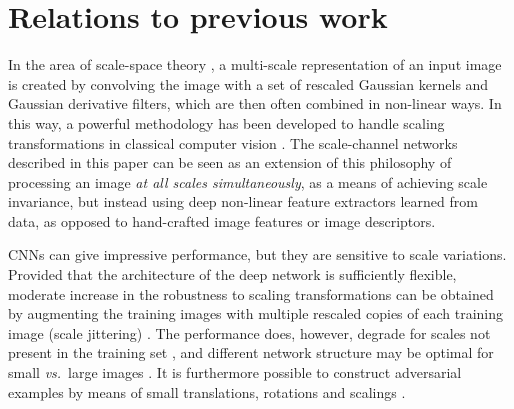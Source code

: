 \documentclass[twocolumn,runningheads]{svjour3}
\begin{document}
\section{Relations to previous work}
\label{sec-related-work}

In the area of scale-space theory 
\cite{Iij62,Wit83,Koe84,KoeDoo92-PAMI,Lin93-Dis,Lin94-SI,Flo97-book,WeiIshImi99-JMIV,Haa04-book,DuiFloGraRom04-JMIV,Lin10-JMIV},
a multi-scale representation of an input image is created by
convolving the image with a set of rescaled Gaussian kernels and
Gaussian derivative filters, which are then often combined in
non-linear ways. 
In this way, a powerful methodology has been developed to handle
scaling transformations in classical computer vision
\cite{Lin97-IJCV,Lin98-IJCV,LG96-IVC,BL97-CVIU,ChoVerHalCro00-ECCV,MikSch04-IJCV,Low04-IJCV,BayEssTuyGoo08-CVIU,TuyMik08-Book,Lin15-JMIV}.
The scale-channel networks described in this paper can be seen as an extension of this philosophy of 
processing an image {\em at all scales simultaneously\/}, as a means of
achieving scale invariance, but instead using deep non-linear feature
extractors learned from data, as opposed to hand-crafted image features
or image descriptors.

CNNs can give impressive performance, but they are sensitive to scale
variations. Provided that the architecture of the deep network is
sufficiently flexible, moderate increase in the robustness to scaling
transformations can be obtained by augmenting the training images with
multiple rescaled copies of each training image (scale jittering)
\cite{BarCas91-TNN,SimZis15-ICLR}.
The performance does, however, degrade for scales not present in the training set
\cite{EngTraTsiSchMad19-ICML,FawFro15-BMVC,SinDav18-CVPR}, and
different network structure may be optimal for small {\em vs.\/}\ large images
\cite{SinDav18-CVPR}. It is furthermore possible to construct adversarial
examples by means of small translations, rotations and scalings
\cite{EngTraTsiSchMad17-arXiv,FawFro15-BMVC}.
\end{document}
